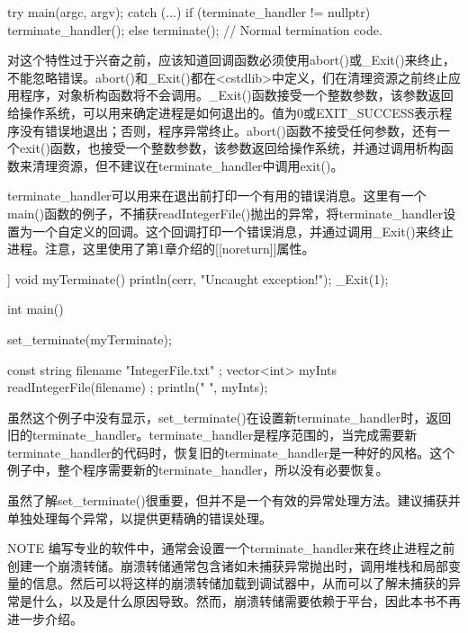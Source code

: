 \begin{cpp}
try {
    main(argc, argv);
} catch (...) {
    if (terminate_handler != nullptr) {
        terminate_handler();
    } else {
        terminate();
    }
}
// Normal termination code.
\end{cpp}

对这个特性过于兴奋之前，应该知道回调函数必须使用abort()或\_Exit()来终止，不能忽略错误。abort()和\_Exit()都在<cstdlib>中定义，们在清理资源之前终止应用程序，对象析构函数将不会调用。\_Exit()函数接受一个整数参数，该参数返回给操作系统，可以用来确定进程是如何退出的。值为0或EXIT\_SUCCESS表示程序没有错误地退出；否则，程序异常终止。abort()函数不接受任何参数，还有一个exit()函数，也接受一个整数参数，该参数返回给操作系统，并通过调用析构函数来清理资源，但不建议在terminate\_handler中调用exit()。

terminate\_handler可以用来在退出前打印一个有用的错误消息。这里有一个main()函数的例子，不捕获readIntegerFile()抛出的异常，将terminate\_handler设置为一个自定义的回调。这个回调打印一个错误消息，并通过调用\_Exit()来终止进程。注意，这里使用了第1章介绍的[[noreturn]]属性。

\begin{cpp}
[[noreturn]] void myTerminate()
{
    println(cerr, "Uncaught exception!");
    _Exit(1);
}

int main()
{
    set_terminate(myTerminate);

    const string filename { "IntegerFile.txt" };
    vector<int> myInts { readIntegerFile(filename) };
    println("{} ", myInts);
}
\end{cpp}

虽然这个例子中没有显示，set\_terminate()在设置新terminate\_handler时，返回旧的terminate\_handler。terminate\_handler是程序范围的，当完成需要新terminate\_handler的代码时，恢复旧的terminate\_handler是一种好的风格。这个例子中，整个程序需要新的terminate\_handler，所以没有必要恢复。

虽然了解set\_terminate()很重要，但并不是一个有效的异常处理方法。建议捕获并单独处理每个异常，以提供更精确的错误处理。

\begin{myNotic}{NOTE}
编写专业的软件中，通常会设置一个terminate\_handler来在终止进程之前创建一个崩溃转储。崩溃转储通常包含诸如未捕获异常抛出时，调用堆栈和局部变量的信息。然后可以将这样的崩溃转储加载到调试器中，从而可以了解未捕获的异常是什么，以及是什么原因导致。然而，崩溃转储需要依赖于平台，因此本书不再进一步介绍。
\end{myNotic}


